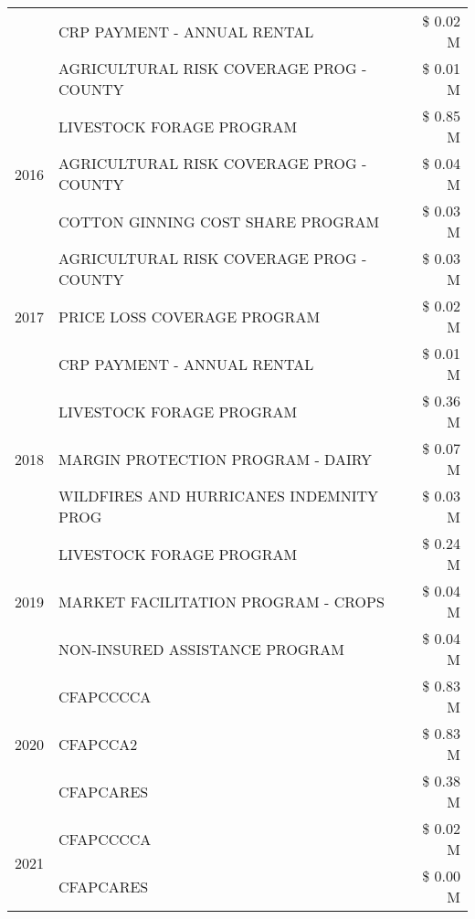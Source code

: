 \begin{tabular}{llr}
 & CRP PAYMENT - ANNUAL RENTAL & \$ 0.02 M \\
 & AGRICULTURAL RISK COVERAGE PROG - COUNTY & \$ 0.01 M \\
\cline{1-3}
\multirow[t]{3}{*}{2016} & LIVESTOCK FORAGE PROGRAM & \$ 0.85 M \\
 & AGRICULTURAL RISK COVERAGE PROG - COUNTY & \$ 0.04 M \\
 & COTTON GINNING COST SHARE PROGRAM & \$ 0.03 M \\
\cline{1-3}
\multirow[t]{3}{*}{2017} & AGRICULTURAL RISK COVERAGE PROG - COUNTY & \$ 0.03 M \\
 & PRICE LOSS COVERAGE PROGRAM & \$ 0.02 M \\
 & CRP PAYMENT - ANNUAL RENTAL & \$ 0.01 M \\
\cline{1-3}
\multirow[t]{3}{*}{2018} & LIVESTOCK FORAGE PROGRAM & \$ 0.36 M \\
 & MARGIN PROTECTION PROGRAM - DAIRY & \$ 0.07 M \\
 & WILDFIRES AND HURRICANES INDEMNITY PROG & \$ 0.03 M \\
\cline{1-3}
\multirow[t]{3}{*}{2019} & LIVESTOCK FORAGE PROGRAM & \$ 0.24 M \\
 & MARKET FACILITATION PROGRAM - CROPS & \$ 0.04 M \\
 & NON-INSURED ASSISTANCE PROGRAM & \$ 0.04 M \\
\cline{1-3}
\multirow[t]{3}{*}{2020} & CFAPCCCCA & \$ 0.83 M \\
 & CFAPCCA2 & \$ 0.83 M \\
 & CFAPCARES & \$ 0.38 M \\
\cline{1-3}
\multirow[t]{2}{*}{2021} & CFAPCCCCA & \$ 0.02 M \\
 & CFAPCARES & \$ 0.00 M \\
\cline{1-3}
\bottomrule
\end{tabular}
